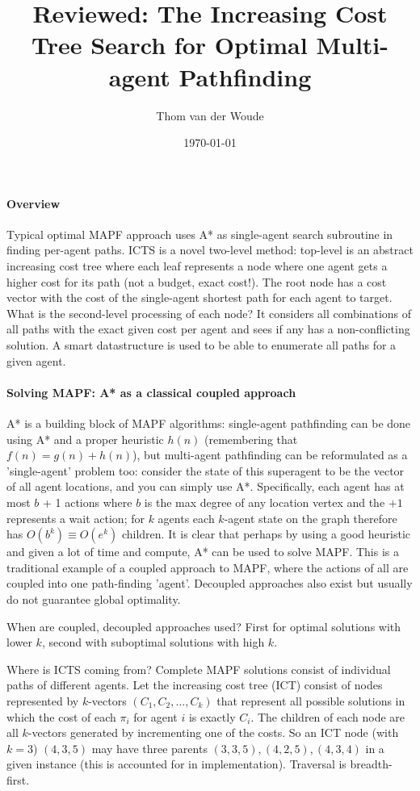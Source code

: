 \documentclass[a4paper,10pt,english]{article}
\title{Reviewed: The Increasing Cost Tree Search for Optimal Multi-agent Pathfinding}
\author{Thom van der Woude}
\date{\today}
\begin{document}
	\maketitle
	\paragraph{Overview}
	Typical optimal MAPF approach uses A* as single-agent search subroutine in finding per-agent paths. ICTS is a novel two-level method: top-level is an abstract increasing cost tree where each leaf represents a node where one agent gets a higher cost for its path (not a budget, exact cost!). The root node has a cost vector with the cost of the single-agent shortest path for each agent to target. What is the second-level processing of each node? It considers all combinations of all paths with the exact given cost per agent and sees if any has a non-conflicting solution. A smart datastructure is used to be able to enumerate all paths for a given agent.
	\paragraph{Solving MAPF: A* as a classical coupled approach}
    A* is a building block of MAPF algorithms: single-agent pathfinding can be done using A* and a proper heuristic $h(n)$ (remembering that $f(n) = g(n) + h(n)$), but multi-agent pathfinding can be reformulated as a 'single-agent' problem too: consider the state of this superagent to be the vector of all agent locations, and you can simply use A*. Specifically, each agent has at most $b$ + 1 actions where $b$ is the max degree of any location vertex and the $+1$ represents a wait action; for $k$ agents each $k$-agent state on the graph therefore has $O(b^k) \equiv O(e^k)$ children. It is clear that perhaps by using a good heuristic and given a lot of time and compute, A* can be used to solve MAPF. This is a traditional example of a coupled approach to MAPF, where the actions of all are coupled into one path-finding 'agent'. Decoupled approaches also exist but usually do not guarantee global optimality.
    
    When are coupled, decoupled approaches used? First for optimal solutions with lower $k$, second with suboptimal solutions with high $k$.
    
    Where is ICTS coming from? Complete MAPF solutions consist of individual paths of different agents. Let the increasing cost tree (ICT) consist of nodes represented by $k$-vectors $(C_1,C_2,\ldots,C_k)$ that represent all possible solutions in which the cost of each $\pi_i$ for agent $i$ is exactly $C_i$. The children of each node are all $k$-vectors generated by incrementing one of the costs. So an ICT node (with $k = 3$) $(4,3,5)$ may have three parents $(3,3,5),(4,2,5),(4,3,4)$ in a given instance (this is accounted for in implementation). Traversal is breadth-first. 
    
\end{document}
